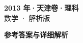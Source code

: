 \documentclass[zihao=-4, a4paper]{ctexart}
\begin{document}
\begin{center}
  {\Large\bfseries 2013 年·天津卷·理科}\\[4pt]
  {\large 数学 · 解析版}
\end{center}
\medskip
{}

\clearpage
{}
\begin{center}{\Large\bfseries 参考答案与详细解析}\end{center}
\medskip

\end{document}
